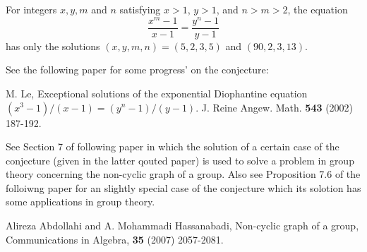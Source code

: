 \documentclass[12pt]{article}
\begin{document}
For integers $x,y,m $ and $n$ satisfying $x>1$, $y>1$, and $n>m>2$, the equation
$$\frac{x^m - 1}{x-1}=\frac{y^n - 1}{y - 1}$$
has only the solutions $(x,y,m,n)=(5,2,3,5)$ and $(90,2,3,13)$.




See the following paper   for some progress' on the conjecture:

M. Le, Exceptional solutions of the exponential Diophantine equation 
$(x^3-1)/(x-1)=(y^n-1)/(y-1)$. J. Reine Angew. Math. {\bf 543} (2002) 187-192.

See Section 7 of following paper in which the solution of a certain case of the
conjecture (given in the
latter qouted paper) is used to solve a
problem in group theory concerning  the non-cyclic graph of a group. Also see
Proposition 7.6 of 
the folloiwng paper for an slightly special case of  the conjecture which its
solotion has some 
applications in group theory.

Alireza Abdollahi and A. Mohammadi Hassanabadi, Non-cyclic graph of a group, 
Communications in Algebra, {\bf 35} (2007) 2057-2081.
\end{document}
